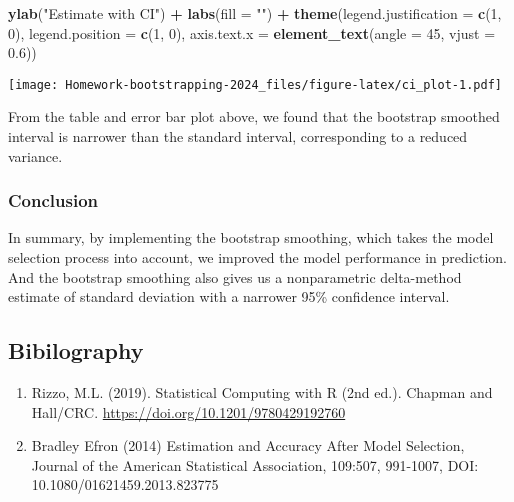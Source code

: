 \documentclass[
]{article}
\newenvironment{Shaded}{\begin{snugshade}}{\end{snugshade}}
\newcommand{\AttributeTok}[1]{\textcolor[rgb]{0.13,0.29,0.53}{#1}}
\newcommand{\DecValTok}[1]{\textcolor[rgb]{0.00,0.00,0.81}{#1}}
\newcommand{\FloatTok}[1]{\textcolor[rgb]{0.00,0.00,0.81}{#1}}
\newcommand{\FunctionTok}[1]{\textcolor[rgb]{0.13,0.29,0.53}{\textbf{#1}}}
\newcommand{\NormalTok}[1]{#1}
\newcommand{\SpecialCharTok}[1]{\textcolor[rgb]{0.81,0.36,0.00}{\textbf{#1}}}
\newcommand{\StringTok}[1]{\textcolor[rgb]{0.31,0.60,0.02}{#1}}
\begin{document}
\begin{Shaded}
\begin{Highlighting}[]
    \FunctionTok{ylab}\NormalTok{(}\StringTok{"Estimate with CI"}\NormalTok{) }\SpecialCharTok{+}
    \FunctionTok{labs}\NormalTok{(}\AttributeTok{fill =} \StringTok{""}\NormalTok{) }\SpecialCharTok{+}
    \FunctionTok{theme}\NormalTok{(}\AttributeTok{legend.justification =} \FunctionTok{c}\NormalTok{(}\DecValTok{1}\NormalTok{, }\DecValTok{0}\NormalTok{), }\AttributeTok{legend.position =} \FunctionTok{c}\NormalTok{(}\DecValTok{1}\NormalTok{, }\DecValTok{0}\NormalTok{), }\AttributeTok{axis.text.x =} \FunctionTok{element\_text}\NormalTok{(}\AttributeTok{angle =} \DecValTok{45}\NormalTok{, }\AttributeTok{vjust =} \FloatTok{0.6}\NormalTok{))}
\end{Highlighting}
\end{Shaded}

\texttt{[image: Homework-bootstrapping-2024\_files/figure-latex/ci\_plot-1.pdf]}

From the table and error bar plot above, we found that the bootstrap
smoothed interval is narrower than the standard interval, corresponding
to a reduced variance.

\hypertarget{conclusion}{%
\subsubsection{Conclusion}\label{conclusion}}

In summary, by implementing the bootstrap smoothing, which takes the
model selection process into account, we improved the model performance
in prediction. And the bootstrap smoothing also gives us a nonparametric
delta-method estimate of standard deviation with a narrower 95\%
confidence interval.

\hypertarget{bibilography}{%
\subsection{Bibilography}\label{bibilography}}

\begin{enumerate}
\def\labelenumi{\arabic{enumi}.}
\item
  Rizzo, M.L. (2019). Statistical Computing with R (2nd ed.). Chapman
  and Hall/CRC. \url{https://doi.org/10.1201/9780429192760}
\item
  Bradley Efron (2014) Estimation and Accuracy After Model Selection,
  Journal of the American Statistical Association, 109:507, 991-1007,
  DOI: 10.1080/01621459.2013.823775
\end{enumerate}
\end{document}
